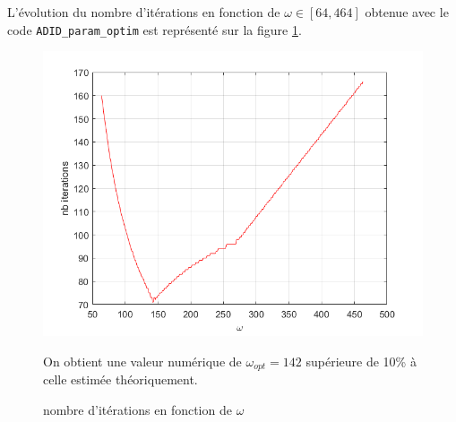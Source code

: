 \documentclass{article}
\begin{document}
L'évolution du nombre d'itérations en fonction de $\omega \in [64, 464]$ obtenue avec le code
{\tt ADID\_param\_optim} est représenté sur la figure \ref{niter}.

\begin{figure}[h!]
 \centering
\includegraphics[scale=0.5]{niter_omega.png}
\caption{nombre d'itérations en fonction de $\omega$}
\label{niter}

On obtient une valeur numérique de $\omega_{opt}=142$  supérieure de 10\% à celle estimée théoriquement.

\end{figure}
\end{document}
